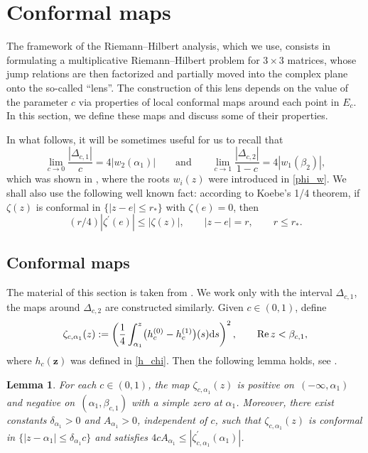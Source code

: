\documentclass[10pt,a4paper]{amsart}
\numberwithin{equation}{section}
\newtheorem{Lemma}[Theorem]{Lemma}
\newcommand{\re}{\operatorname{Re} }
\newcommand{\z}	{{\boldsymbol z}}
\begin{document}
\section{Conformal maps}


The framework of the Riemann--Hilbert analysis, which we use, consists in formulating a multiplicative Riemann--Hilbert problem for $ 3\times3 $ matrices, whose jump relations are then factorized and partially moved into the complex plane onto the so-called ``lens''. The construction of this lens depends on the value of the parameter $ c $ via properties of local conformal maps around each point in $ E_c $. In this section, we define these maps and discuss some of their properties.

In what follows, it will be sometimes useful for us to recall that
\begin{equation}
\label{c-rate}
\lim_{c\to0} \frac{|\Delta_{c,1}|}c = 4|w_2(\alpha_1)| \qquad \text{and}\qquad  \lim_{c\to1} \frac{|\Delta_{c,2}|}{1-c} = 4|w_1(\beta_2)|,
\end{equation}
which was shown in \cite[equation~(4.8)]{ApDenYa21}, where the roots $ w_i(z) $ were introduced in \eqref{phi_w}. We shall also use the following well known fact: according to Koebe's 1/4 theorem, if $ \zeta(z) $ is conformal in $ \{|z-e|\leq r_*\} $ with $ \zeta(e)=0 $, then
\begin{equation}
\label{koebe}
(r/4)|\zeta^\prime(e)| \leq |\zeta(z)|, \qquad |z-e|=r, \qquad r\leq r_*.
\end{equation}

\subsection{Conformal maps}

The material of this section is taken from \cite[Section~7.4]{ApDenYa21}. We work only with the interval $ \Delta_{c,1} $, the maps around $ \Delta_{c,2} $ are constructed similarly. Given $ c\in(0,1) $, define
\begin{equation}
\label{4.1.1}
\zeta_{c,\alpha_1}(z) := \left(\frac14\int_{\alpha_1}^z\bigl(h_c^{(0)}-h_c^{(1)}\bigr)(s) {\rm d}s\right)^2, \qquad \re z<\beta_{c,1},
\end{equation}
where $ h_c(\z) $ was defined in \eqref{h_chi}. Then the following lemma holds, see \cite[Lemma~7.4]{ApDenYa21}.

\begin{Lemma}
\label{lem:4.1}
For each $ c\in(0,1) $, the map $ \zeta_{c,\alpha_1}(z) $ is positive on~$ (-\infty,\alpha_1) $ and negative on~$ (\alpha_1,\beta_{c,1}) $ with a simple zero at $ \alpha_1 $. Moreover, there exist constants $ \delta_{\alpha_1}>0 $ and $ A_{\alpha_1}>0 $, independent of $ c $, such that $ \zeta_{c,\alpha_1}(z) $ is conformal in $ \{|z-\alpha_1| \leq \delta_{\alpha_1}c \} $ and satisfies $ 4cA_{\alpha_1} \leq |\zeta^\prime_{c,\alpha_1}(\alpha_1)| $.
\end{Lemma}
\end{document}
